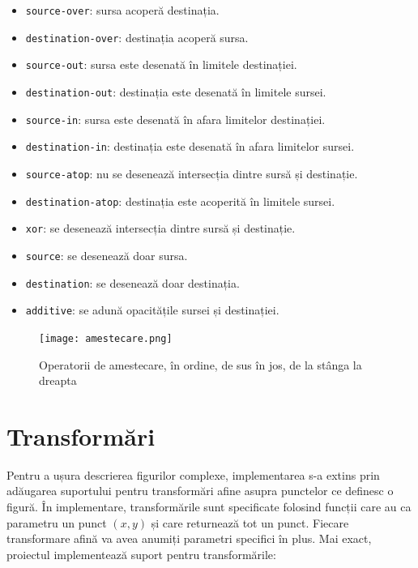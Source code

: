 \documentclass[a4paper, 12pt]{report}
\begin{document}
\begin{itemize}
    \item{\texttt{source-over}: sursa acoperă destinația.}
    \item{\texttt{destination-over}: destinația acoperă sursa.}
    \item{\texttt{source-out}: sursa este desenată în limitele destinației.}
    \item{\texttt{destination-out}: destinația este desenată în limitele sursei.}
    \item{\texttt{source-in}: sursa este desenată în afara limitelor destinației.}
    \item{\texttt{destination-in}: destinația este desenată în afara limitelor sursei.}
    \item{\texttt{source-atop}: nu se desenează intersecția dintre sursă și destinație.}
    \item{\texttt{destination-atop}: destinația este acoperită în limitele sursei.}
    \item{\texttt{xor}: se desenează intersecția dintre sursă și destinație.}
    \item{\texttt{source}: se desenează doar sursa.}
    \item{\texttt{destination}: se desenează doar destinația.}
    \item{\texttt{additive}: se adună opacitățile sursei și destinației.}
\end{itemize}

\begin{figure}[ht]
    \texttt{[image: amestecare.png]}
    \centering
    \caption{Operatorii de amestecare, în ordine, de sus în jos, de la stânga la dreapta}
    \label{fig-alpha-compositing}
\end{figure}

\section{Transformări}

Pentru a ușura descrierea figurilor complexe, implementarea s-a extins prin adăugarea suportului pentru transformări afine asupra punctelor ce definesc
o figură. În implementare, transformările sunt specificate folosind funcții care au ca parametru un punct \((x, y)\) și
care returnează tot un punct. Fiecare transformare afină va avea anumiți parametri specifici în plus.
Mai exact, proiectul implementează suport pentru transformările:
\end{document}
